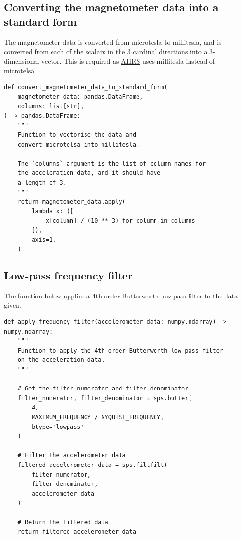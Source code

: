 \documentclass[12pt]{report}
\begin{document}
\subsection{Converting the magnetometer data into a standard form}
\label{sec:org26d2e54}
The magnetometer data is converted from microtesla to millitesla,
and is converted from each of the scalars in the 3 cardinal
directions into a 3-dimensional vector.
This is required as \href{https://ahrs.readthedocs.io/en/latest/}{AHRS} uses millitesla instead of microtelsa.
\begin{verbatim}
def convert_magnetometer_data_to_standard_form(
    magnetometer_data: pandas.DataFrame,
    columns: list[str],
) -> pandas.DataFrame:
    """
    Function to vectorise the data and
    convert microtelsa into millitesla.

    The `columns` argument is the list of column names for
    the acceleration data, and it should have
    a length of 3.
    """
    return magnetometer_data.apply(
        lambda x: ([
            x[column] / (10 ** 3) for column in columns
        ]),
        axis=1,
    )
\end{verbatim}
\subsection{Low-pass frequency filter}
\label{sec:orgb7600bc}
The function below applies a 4th-order Butterworth low-pass filter
to the data given.
\begin{verbatim}
def apply_frequency_filter(accelerometer_data: numpy.ndarray) -> numpy.ndarray:
    """
    Function to apply the 4th-order Butterworth low-pass filter
    on the acceleration data.
    """

    # Get the filter numerator and filter denominator
    filter_numerator, filter_denominator = sps.butter(
        4,
        MAXIMUM_FREQUENCY / NYQUIST_FREQUENCY,
        btype='lowpass'
    )

    # Filter the accelerometer data
    filtered_accelerometer_data = sps.filtfilt(
        filter_numerator,
        filter_denominator,
        accelerometer_data
    )

    # Return the filtered data
    return filtered_accelerometer_data
\end{verbatim}
\end{document}

